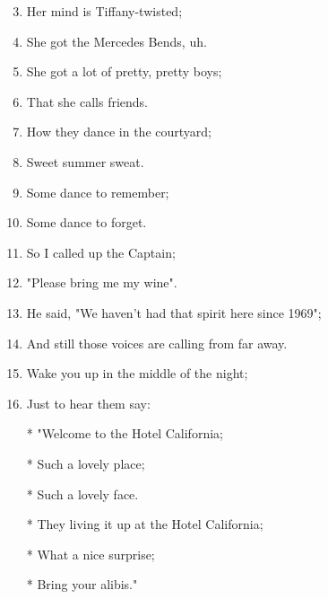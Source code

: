 \documentclass{article}
\begin{document}
\begin{center}
\begin{enumerate}
            \item[]
            \item[] 
            \item Her mind is Tiffany-twisted;
            \item She got the Mercedes Bends, uh.
            \item She got a lot of pretty, pretty boys;
            \item That she calls friends.
            \item How they dance in the courtyard;
            \item Sweet summer sweat.
            \item Some dance to remember;
            \item Some dance to forget.
            \item So I called up the Captain;
            \item "Please bring me my wine".
            \item He said, "We haven't had that spirit here since 1969";
            \item And still those voices are calling from far away.
            \item Wake you up in the middle of the night;
            \item Just to hear them say:
 
            \item[]
            \item[] \chorus
            \item[*] "Welcome to the Hotel California;
            \item[*] Such a lovely place;
            \item[*] Such a lovely face.
            \item[*] They living it up at the Hotel California;
            \item[*] What a nice surprise;
            \item[*] Bring your alibis."
        

\end{enumerate}
\end{center}
\end{document}
